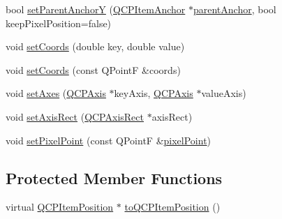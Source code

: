 \begin{DoxyCompactItemize}
\item 
bool \hyperlink{class_q_c_p_item_position_add5ec1db9d19cec58a3b5c9e0a0c3f9d}{set\+Parent\+AnchorY} (\hyperlink{class_q_c_p_item_anchor}{Q\+C\+P\+Item\+Anchor} $\ast$\hyperlink{class_q_c_p_item_position_a0a87f9dce1af6cc9b510785991bcf1c6}{parent\+Anchor}, bool keep\+Pixel\+Position=false)
\item 
void \hyperlink{class_q_c_p_item_position_aa988ba4e87ab684c9021017dcaba945f}{set\+Coords} (double key, double value)
\item 
void \hyperlink{class_q_c_p_item_position_acc70b3abc143287f806e5f154e5e07b0}{set\+Coords} (const Q\+PointF \&coords)
\item 
void \hyperlink{class_q_c_p_item_position_a2185f45c75ac8cb9be89daeaaad50e37}{set\+Axes} (\hyperlink{class_q_c_p_axis}{Q\+C\+P\+Axis} $\ast$key\+Axis, \hyperlink{class_q_c_p_axis}{Q\+C\+P\+Axis} $\ast$value\+Axis)
\item 
void \hyperlink{class_q_c_p_item_position_a0cd9b326fb324710169e92e8ca0041c2}{set\+Axis\+Rect} (\hyperlink{class_q_c_p_axis_rect}{Q\+C\+P\+Axis\+Rect} $\ast$axis\+Rect)
\item 
void \hyperlink{class_q_c_p_item_position_ab404e56d9ac2ac2df0382c57933a71ef}{set\+Pixel\+Point} (const Q\+PointF \&\hyperlink{class_q_c_p_item_position_a6cad070c22801295231f5bd6045afe70}{pixel\+Point})
\end{DoxyCompactItemize}
\subsection*{Protected Member Functions}
\begin{DoxyCompactItemize}
\item 
virtual \hyperlink{class_q_c_p_item_position}{Q\+C\+P\+Item\+Position} $\ast$ \hyperlink{class_q_c_p_item_position_a577a7efc601df85a20b3e709d1ac320e}{to\+Q\+C\+P\+Item\+Position} ()
\end{DoxyCompactItemize}
